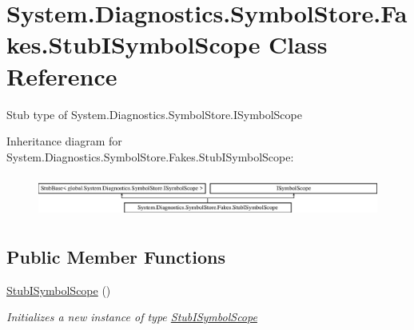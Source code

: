 \hypertarget{class_system_1_1_diagnostics_1_1_symbol_store_1_1_fakes_1_1_stub_i_symbol_scope}{\section{System.\-Diagnostics.\-Symbol\-Store.\-Fakes.\-Stub\-I\-Symbol\-Scope Class Reference}
\label{class_system_1_1_diagnostics_1_1_symbol_store_1_1_fakes_1_1_stub_i_symbol_scope}
}


Stub type of System.\-Diagnostics.\-Symbol\-Store.\-I\-Symbol\-Scope 


Inheritance diagram for System.\-Diagnostics.\-Symbol\-Store.\-Fakes.\-Stub\-I\-Symbol\-Scope\-:\begin{figure}[H]
\begin{center}
\leavevmode
\includegraphics[height=1.389578cm]{class_system_1_1_diagnostics_1_1_symbol_store_1_1_fakes_1_1_stub_i_symbol_scope}
\end{center}
\end{figure}
\subsection*{Public Member Functions}
\begin{DoxyCompactItemize}
\item 
\hyperlink{class_system_1_1_diagnostics_1_1_symbol_store_1_1_fakes_1_1_stub_i_symbol_scope_a26ef625c804029cef928c1fee245168a}{Stub\-I\-Symbol\-Scope} ()
\begin{DoxyCompactList}\small\item\em Initializes a new instance of type \hyperlink{class_system_1_1_diagnostics_1_1_symbol_store_1_1_fakes_1_1_stub_i_symbol_scope}{Stub\-I\-Symbol\-Scope}\end{DoxyCompactList}\end{DoxyCompactItemize}
